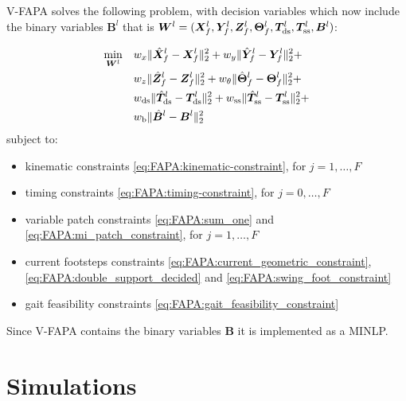V-FAPA solves the following problem, with decision variables which now include the binary variables $\bm{B}^{l}$ that is ${\bm{W}}^l = (\bm{X}_f^l, \bm{Y}_f^l, \bm{Z}_f^l, \bm{\Theta}_f^l, \bm{T}_{\rm ds}^l, \bm{T}_{\rm ss}^l, \bm{B}^{l})$:
\begin{braced}
\begin{equation*}\begin{split}
\min_{{\bm{W}}^l} \quad
& w_x \| \hat{\bm{X}}_f^l - \bm{X}_f^l \|_2^2 + w_y \| \hat{\bm{Y}}_f^l - \bm{Y}_f^l \|_2^2 + \\& w_z \| \hat{\bm{Z}}_f^l - \bm{Z}_f^l \|_2^2 + w_{\theta} \| \hat{\bm{\Theta}}_f^l - \bm{\Theta}_f^l \|_2^2 + \\& w_{\rm ds} \| \hat{\bm{T}}_{\rm ds}^l - \bm{T}_{\rm ds}^l \|_2^2 + w_{\rm ss} \| \hat{\bm{T}}_{\rm ss}^l - \bm{T}_{\rm ss}^l \|_2^2 +  \\&
w_{\rm b} \| \hat{\bm{B}}^l - \bm{B}^l \|_2^2
\end{split}\end{equation*}
\hspace{0.25cm} subject to:
\begin{itemize}
\item kinematic constraints \eqref{eq:FAPA:kinematic-constraint}, for $j=1,\dots,F$
\item timing constraints \eqref{eq:FAPA:timing-constraint}, for $j=0,\dots,F$
\item variable patch constraints \eqref{eq:FAPA:sum_one} and \eqref{eq:FAPA:mi_patch_constraint}, for $j=1,\dots,F$
\item current footsteps constraints \eqref{eq:FAPA:current_geometric_constraint}, \eqref{eq:FAPA:double_support_decided} and \eqref{eq:FAPA:swing_foot_constraint}
\item gait feasibility constraints \eqref{eq:FAPA:gait_feasibility_constraint}
\end{itemize}
\end{braced}

\medskip

Since V-FAPA contains the binary variables $\bm{B}$ it is implemented as a MINLP. %

\section{Simulations}
\label{sec:FAPA:Simulations}


